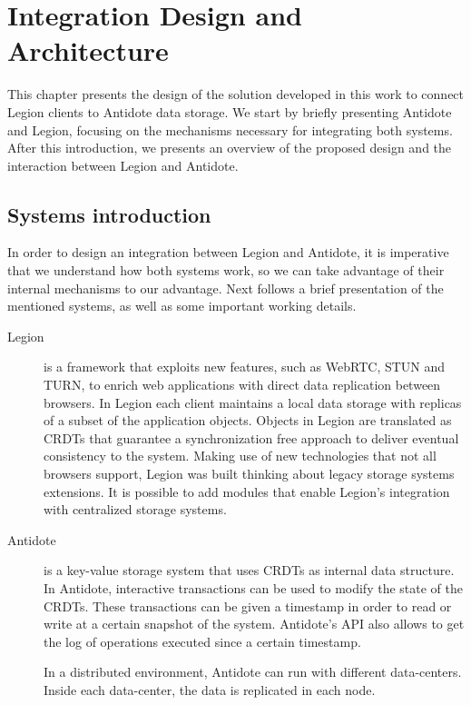 \chapter{Integration Design and Architecture}
\label{cha:integration_design_and_architecture}

This chapter presents the design of the solution developed in this work to connect Legion clients to Antidote data storage. We start by briefly presenting Antidote and Legion, focusing on the mechanisms necessary for integrating both systems. After this introduction, we presents an overview of the proposed design and the interaction between Legion and Antidote.

\section{Systems introduction}
\label{sec:system_introduction}
In order to design an integration between Legion and Antidote, it is imperative that we understand how both systems work, so we can take advantage of their internal mechanisms to our advantage. Next follows a brief presentation of the mentioned systems, as well as some important working details.

\begin{description}

\item[Legion] is a framework that exploits new features, such as WebRTC, STUN and TURN, to enrich web applications with direct data replication between browsers. In Legion each client maintains a local data storage with replicas of a subset of the application objects. Objects in Legion are translated as CRDTs that guarantee a synchronization free approach to deliver eventual consistency to the system. Making use of new technologies that not all browsers support, Legion was built thinking about legacy storage systems extensions. It is possible to add modules that enable Legion's integration with centralized storage systems.

\item[Antidote] is a key-value storage system that uses CRDTs as internal data structure. In Antidote, interactive transactions can be used to modify the state of the CRDTs. These transactions can be given a timestamp in order to read or write at a certain snapshot of the system. Antidote's API also allows to get the log of operations executed since a certain timestamp.\par
	In a distributed environment, Antidote can run with different data-centers. Inside each data-center, the data is replicated in each node.

\end{description}

